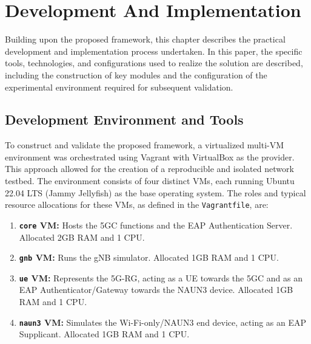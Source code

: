 \chapter{Development And Implementation}%
\label{chapter:development-and-implementation}

\begin{introduction}
Building upon the proposed framework, this chapter describes the practical development and implementation process undertaken. In this paper, the specific tools, technologies, and configurations used to realize the solution are described, including the construction of key modules and the configuration of the experimental environment required for subsequent validation.
\end{introduction}

\section{Development Environment and Tools}

To construct and validate the proposed framework, a virtualized multi-\ac{VM} environment was orchestrated using Vagrant with VirtualBox as the provider. This approach allowed for the creation of a reproducible and isolated network testbed. The environment consists of four distinct \acp{VM}, each running Ubuntu 22.04 LTS (Jammy Jellyfish) as the base operating system. The roles and typical resource allocations for these \acp{VM}, as defined in the \texttt{Vagrantfile}, are:

\begin{enumerate}
    \item \textbf{\texttt{core} \ac{VM}:} Hosts the \ac{5GC} functions and the \ac{EAP} Authentication Server. Allocated 2\ac{GB} \ac{RAM} and 1 \ac{CPU}.

    \item \textbf{\texttt{gnb} \ac{VM}:} Runs the \ac{gNB} simulator. Allocated 1\ac{GB} \ac{RAM} and 1 \ac{CPU}.

    \item \textbf{\texttt{ue} \ac{VM}:} Represents the \ac{5G-RG}, acting as a \ac{UE} towards the \ac{5GC} and as an \ac{EAP} Authenticator/Gateway towards the \ac{NAUN3} device. Allocated 1\ac{GB} \ac{RAM} and 1 \ac{CPU}.

    \item \textbf{\texttt{naun3} \ac{VM}:} Simulates the Wi-Fi-only/\ac{NAUN3} end device, acting as an \ac{EAP} Supplicant. Allocated 1\ac{GB} \ac{RAM} and 1 \ac{CPU}.
\end{enumerate}

